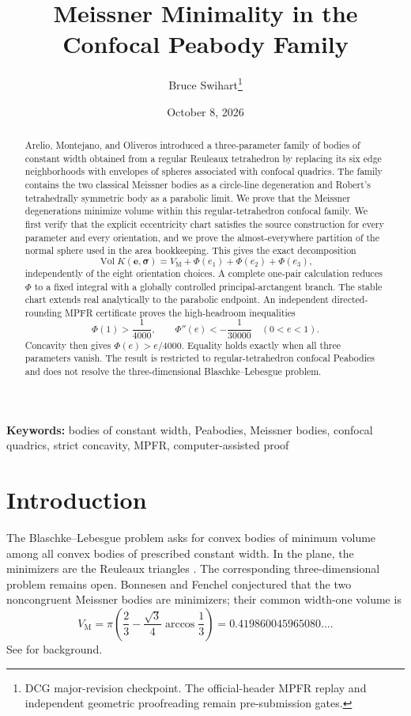 \documentclass[11pt]{article}
\title{Meissner Minimality in the Confocal Peabody Family}
\author{Bruce Swihart\thanks{DCG major-revision checkpoint.  The official-header MPFR replay and independent geometric proofreading remain pre-submission gates.}}
\date{October 8, 2026}
\numberwithin{equation}{section}
\theoremstyle{remark}
\newcommand{\Vol}{\operatorname{Vol}}
\newcommand{\VM}{V_{\mathrm M}}
\begin{document}
\maketitle

\begin{abstract}
Arelio, Montejano, and Oliveros introduced a three-parameter family of bodies of constant width obtained from a regular Reuleaux tetrahedron by replacing its six edge neighborhoods with envelopes of spheres associated with confocal quadrics.  The family contains the two classical Meissner bodies as a circle-line degeneration and Robert's tetrahedrally symmetric body as a parabolic limit.  We prove that the Meissner degenerations minimize volume within this regular-tetrahedron confocal family.  We first verify that the explicit eccentricity chart satisfies the source construction for every parameter and every orientation, and we prove the almost-everywhere partition of the normal sphere used in the area bookkeeping.  This gives the exact decomposition
\[
  \Vol K(\mathbf e,\boldsymbol\sigma)
  =\VM+\Phi(e_1)+\Phi(e_2)+\Phi(e_3),
\]
independently of the eight orientation choices.  A complete one-pair calculation reduces \(\Phi\) to a fixed integral with a globally controlled principal-arctangent branch.  The stable chart extends real analytically to the parabolic endpoint.  An independent directed-rounding MPFR certificate proves the high-headroom inequalities
\[
  \Phi(1)>\frac1{4000},
  \qquad
  \Phi''(e)<-\frac1{30000}\quad(0<e<1).
\]
Concavity then gives \(\Phi(e)>e/4000\).  Equality holds exactly when all three parameters vanish.  The result is restricted to regular-tetrahedron confocal Peabodies and does not resolve the three-dimensional Blaschke--Lebesgue problem.
\end{abstract}

\noindent\textbf{Keywords:} bodies of constant width, Peabodies, Meissner bodies, confocal quadrics, strict concavity, MPFR, computer-assisted proof

\section{Introduction}

The Blaschke--Lebesgue problem asks for convex bodies of minimum volume among all convex bodies of prescribed constant width.  In the plane, the minimizers are the Reuleaux triangles \cite{Blaschke1915,Lebesgue1914}.  The corresponding three-dimensional problem remains open.  Bonnesen and Fenchel conjectured that the two noncongruent Meissner bodies are minimizers; their common width-one volume is
\begin{equation}
  \VM
  =\pi\left(\frac23-\frac{\sqrt3}{4}\arccos\frac13\right)
  =0.419860045965080\ldots .
  \label{eq:meissner-volume}
\end{equation}
See \cite{KawohlWeber2011,MartiniMontejanoOliveros2019,Nishioka2026} for background.
\end{document}
